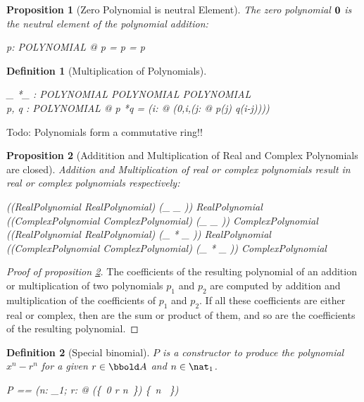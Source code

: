 \documentclass[12pt]{scrartcl}
\newtheorem{prop}{Proposition}[section]
\newtheorem{zdef}{Definition}[section]
\begin{document}
\begin{prop}[Zero Polynomial is neutral Element]
  \label{prop:zero-polynomial-neutral-element}
  The zero polynomial $\mathbf{0}$ is the neutral element of the
  polynomial addition:
  \begin{zed}
    \forall p: POLYNOMIAL @ p \polyplus \zeropol = \zeropol \polyplus
    p = p
  \end{zed}
\end{prop}
% 
\newcommand{\polymult}{*}
\begin{zdef}[Multiplication of Polynomials]
  \label{zdef:polynomial-multiplication}
  \begin{axdef}
    \_ \polymult \_ : POLYNOMIAL \cross POLYNOMIAL \fun POLYNOMIAL\\
    \where
    \forall p, q : POLYNOMIAL @ p \polymult q = (\lambda i: \nat @
    \finsum(0,i,(\lambda j: \nat @ p(j) \amult q(i-j))))
  \end{axdef}
\end{zdef}
%
Todo: Polynomials form a commutative ring!!
% 
\begin{prop}[Additition and Multiplication of Real and Complex
  Polynomials are closed]
  \label{prop:closure-of-real-complex-addition-multiplication}
  Addition and Multiplication of real or complex polynomials result in
  real or complex polynomials respectively:
  \begin{zed}
    \ran ((RealPolynomial \cross RealPolynomial) \dres (\_ \polyplus
    \_ )) \subseteq RealPolynomial\\
    \ran ((ComplexPolynomial \cross ComplexPolynomial) \dres (\_ \polyplus
    \_ )) \subseteq ComplexPolynomial\\
    \ran ((RealPolynomial \cross RealPolynomial) \dres (\_ \polymult
    \_ )) \subseteq RealPolynomial\\
    \ran ((ComplexPolynomial \cross ComplexPolynomial) \dres (\_ \polymult
    \_ )) \subseteq ComplexPolynomial\\
  \end{zed}
\end{prop}
\begin{proof}[Proof of proposition
  \ref{prop:closure-of-real-complex-addition-multiplication}]
  The coefficients of the resulting polynomial of an addition or
  multiplication of two polynomials $p_1$ and $p_2$ are computed by addition and
  multiplication of the coefficients of $p_1$ and $p_2$. If all these
  coefficients are either real or complex, then are the sum or product
  of them, and so are the coefficients of the resulting polynomial.
\end{proof}
%
\begin{zdef}[Special binomial]
  \label{zdef:special-binnomial}
  $P$ is a constructor to produce the polynomial $x^n - r^n$ for a
  given $r \in \arithmos$ and $n \in \nat_1$.
  \begin{zed}
    P == (\lambda n: \nat_1; r: \arithmos @ (\zeropol \oplus \{~0 \mapsto
    r \apwr n~\}) \oplus \{~n \mapsto \aone ~\})
  \end{zed}
\end{zdef}
\end{document}
